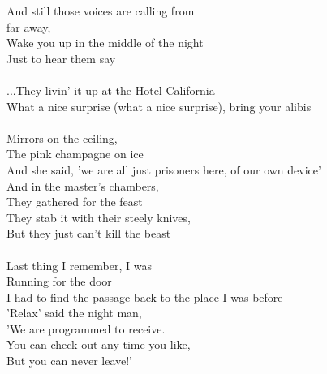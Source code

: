 {And still those voices are calling from\\
far away,\\
Wake you up in the middle of the night\\
Just to hear them say\\
\\
...They livin' it up at the Hotel California\\
What a nice surprise (what a nice surprise), bring your alibis\\
\\
Mirrors on the ceiling,\\
The pink champagne on ice\\
And she said, 'we are all just prisoners here, of our own device'\\
And in the master's chambers,\\
They gathered for the feast\\
They stab it with their steely knives,\\
But they just can't kill the beast\\
\\
Last thing I remember, I was\\
Running for the door\\
I had to find the passage back to the place I was before\\
'Relax' said the night man,\\
'We are programmed to receive.\\
You can check out any time you like,\\
But you can never leave!'
}






